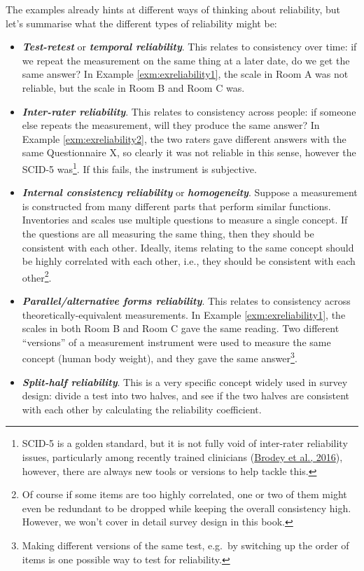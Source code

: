 \documentclass[
  11pt,
  a4paper,
  twoside,symmetric,openright]{book}
\providecommand{\tightlist}{%
  \setlength{\itemsep}{0pt}\setlength{\parskip}{0pt}}
\theoremstyle{break}
\theoremstyle{break}
\begin{document}
The examples already hints at different ways of thinking about reliability, but let's summarise what the different types of reliability might be:

\begin{itemize}
\tightlist
\item
  \textbf{\emph{Test-retest}} or \textbf{\emph{temporal reliability}}. This relates to consistency over time: if we repeat the measurement on the same thing at a later date, do we get the same answer? In Example \ref{exm:exreliability1}, the scale in Room A was not reliable, but the scale in Room B and Room C was.
\item
  \textbf{\emph{Inter-rater reliability}}. This relates to consistency across people: if someone else repeats the measurement, will they produce the same answer? In Example \ref{exm:exreliability2}, the two raters gave different answers with the same Questionnaire X, so clearly it was not reliable in this sense, however the SCID-5 was\footnote{SCID-5 is a golden standard, but it is not fully void of inter-rater reliability issues, particularly among recently trained clinicians (\protect\hyperlink{ref-brodeyValidationNetSCIDAutomated2016}{Brodey et al., 2016}), however, there are always new tools or versions to help tackle this.}. If this fails, the instrument is subjective.
\item
  \textbf{\emph{Internal consistency reliability}} or \textbf{\emph{homogeneity}}. Suppose a measurement is constructed from many different parts that perform similar functions. Inventories and scales use multiple questions to measure a single concept. If the questions are all measuring the same thing, then they should be consistent with each other. Ideally, items relating to the same concept should be highly correlated with each other, i.e., they should be consistent with each other\footnote{Of course if some items are too highly correlated, one or two of them might even be redundant to be dropped while keeping the overall consistency high. However, we won't cover in detail survey design in this book.}.
\item
  \textbf{\emph{Parallel/alternative forms reliability}}. This relates to consistency across theoretically-equivalent measurements. In Example \ref{exm:exreliability1}, the scales in both Room B and Room C gave the same reading. Two different ``versions'' of a measurement instrument were used to measure the same concept (human body weight), and they gave the same answer\footnote{Making different versions of the same test, e.g.~by switching up the order of items is one possible way to test for reliability.}.
\item
  \textbf{\emph{Split-half reliability}}. This is a very specific concept widely used in survey design: divide a test into two halves, and see if the two halves are consistent with each other by calculating the reliability coefficient.
\end{itemize}
\end{document}
